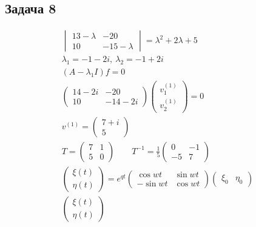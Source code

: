 \subsection*{Задача 8}
\begin{figure}[!h]
	\begin{minipage}[h]{0.49\linewidth}
		\begin{gather*}
			\begin{vmatrix}
				13 - \lambda & -20\\
				10 & -15 - \lambda
			\end{vmatrix}
			=
			\lambda^2 + 2\lambda + 5\\
			\lambda_1 = -1-2i,\ \lambda_2 = -1+2i\\
			\left(A - \lambda_1 I\right)f = 0\\
			\begin{pmatrix}
				14 - 2i & -20\\
				10 & -14-2i
			\end{pmatrix}
			\begin{pmatrix}
				v_1^{\left(1\right)} \\ v_2^{\left(1\right)}
			\end{pmatrix}
			= 0\\
			v^{\left(1\right)} =
			\begin{pmatrix}
				7 + i \\ 5
			\end{pmatrix}\\
			T = 
			\begin{pmatrix}
				7 & 1\\
				5 & 0
			\end{pmatrix}\qquad
			T^{-1} = \frac{1}{5}
			\begin{pmatrix}
				0 & -1\\
				-5 & 7
			\end{pmatrix}\\
			\begin{pmatrix}
				\xi\left(t\right) \\ \eta\left(t\right)
			\end{pmatrix}
			= e^{qt}
			\begin{pmatrix}
				\cos wt & \sin wt\\
				-\sin wt & \cos wt
			\end{pmatrix}
			\begin{pmatrix}
				\xi_0 & \eta_0
			\end{pmatrix}\\
			\begin{pmatrix}
				\xi\left(t\right) \\ \eta\left(t\right)

\end{pmatrix}
\end{gather*}
\end{minipage}
\end{figure}

